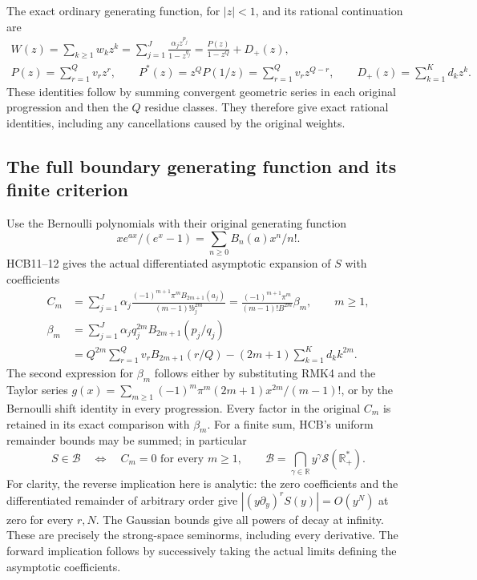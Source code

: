 \documentclass[11pt]{article}
\begin{document}
The exact ordinary generating function, for $|z|<1$, and its rational
continuation are
\begin{equation}\tag{RMK5}
\begin{gathered}
 W(z)=\sum_{k\geq1}w_kz^k
     =\sum_{j=1}^J\frac{\alpha_jz^{p_j}}{1-z^{q_j}}
     =\frac{P(z)}{1-z^Q}+D_+(z),\\
 P(z)=\sum_{r=1}^Qv_r z^r,\qquad
 P^*(z)=z^QP(1/z)=\sum_{r=1}^Qv_r z^{Q-r},\qquad
 D_+(z)=\sum_{k=1}^K d_kz^k.
\end{gathered}
\end{equation}
These identities follow by summing convergent geometric series in
each original progression and then the $Q$ residue classes. They
therefore give exact rational identities, including any cancellations
caused by the original weights.

\subsection{The full boundary generating function and its finite criterion}

Use the Bernoulli polynomials with their original generating function
\[xe^{a x}/(e^x-1)=\sum_{n\geq0}B_n(a)x^n/n!.\] HCB11--12 gives
the actual differentiated asymptotic expansion of $S$ with coefficients
\begin{equation}\tag{RMK6}
\begin{split}
 C_m&=\sum_{j=1}^J\alpha_j
   \frac{(-1)^{m+1}\pi^mB_{2m+1}(a_j)}{(m-1)!b_j^{2m}}
    =\frac{(-1)^{m+1}\pi^m}{(m-1)!B^{2m}}\beta_m,
       \qquad m\geq1,\\
 \beta_m&=\sum_{j=1}^J\alpha_jq_j^{2m}B_{2m+1}(p_j/q_j)\\
 &=Q^{2m}\sum_{r=1}^Qv_r B_{2m+1}(r/Q)
        -(2m+1)\sum_{k=1}^K d_k k^{2m}.
\end{split}
\end{equation}
The second expression for $\beta_m$ follows either by substituting
RMK4 and the Taylor series
$g(x)=\sum_{m\geq1}(-1)^m\pi^m(2m+1)x^{2m}/(m-1)!$, or by the
Bernoulli shift identity in every progression. Every factor in the
original $C_m$ is retained in its exact comparison with $\beta_m$.
For a finite sum, HCB's uniform remainder bounds may be summed;
in particular
\begin{equation}\tag{RMK7}
 S\in\mathcal B
 \quad\Longleftrightarrow\quad C_m=0\text{ for every }m\geq1,
 \qquad
 \mathcal B=\bigcap_{\gamma\in\mathbb R}y^\gamma
                    \mathcal S(\mathbb R_+^*).
\end{equation}
For clarity, the reverse implication here is analytic: the zero
coefficients and the differentiated remainder of arbitrary order
give $|(y\partial_y)^rS(y)|=O(y^N)$ at zero for every $r,N$.
The Gaussian bounds give all powers of decay at infinity. These
are precisely the strong-space seminorms, including every derivative.
The forward implication follows by successively taking the actual
limits defining the asymptotic coefficients.
\end{document}
